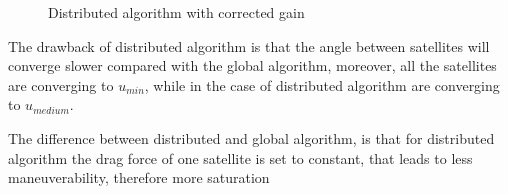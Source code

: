 \begin{table}[H]
\begin{minipage}[b]{0.49\linewidth}
\begin{figure}[H]
			\caption{Distributed algorithm with corrected gain}
			\label{fig:da2}
		\end{figure}
	\end{minipage}
\end{table}
The drawback of distributed algorithm is that the angle between satellites will converge slower compared with the global algorithm, moreover, all the satellites are converging to $u_{min}$, while in the case of distributed algorithm are converging to $u_{medium}$. 

The difference between distributed and global algorithm, is that for distributed algorithm the drag force of one satellite is set to constant, that leads to less maneuverability, therefore more saturation